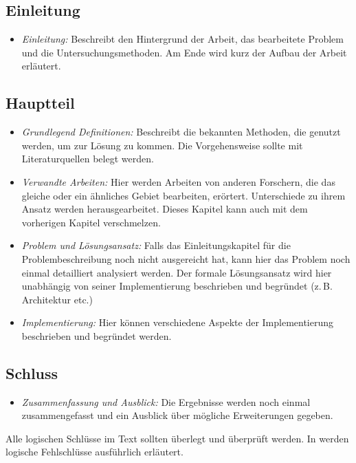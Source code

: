 \documentclass[conference,final,a4paper]{IEEEtran}
\begin{document}
\subsection{Einleitung}
\begin{itemize}
\item \emph{Einleitung:} Beschreibt den Hintergrund der Arbeit, das bearbeitete Problem und die Untersuchungsmethoden. Am Ende wird kurz der Aufbau der Arbeit erläutert.
\end{itemize}
\subsection{Hauptteil}
\begin{itemize}
\item \emph{Grundlegend Definitionen:} Beschreibt die bekannten Methoden, die genutzt werden, um zur Lösung zu kommen. Die Vorgehensweise sollte mit Literaturquellen belegt werden.
\item \emph{Verwandte Arbeiten:} Hier werden Arbeiten von anderen Forschern, die das gleiche oder ein ähnliches Gebiet bearbeiten, erörtert. Unterschiede zu ihrem Ansatz werden herausgearbeitet. Dieses Kapitel kann auch mit dem vorherigen Kapitel verschmelzen.
\item \emph{Problem und Lösungsansatz:} Falls das Einleitungskapitel für die Problembeschreibung noch nicht ausgereicht hat, kann hier das Problem noch einmal detailliert analysiert werden. Der formale Lösungsansatz wird hier unabhängig von seiner Implementierung beschrieben und begründet (z.\,B. Architektur etc.)
\item \emph{Implementierung:} Hier können verschiedene Aspekte der Implementierung beschrieben und begründet werden. 
\end{itemize}
\subsection{Schluss}
\begin{itemize}
\item \emph{Zusammenfassung und Ausblick:} Die Ergebnisse werden noch einmal zusammengefasst und ein Ausblick über mögliche Erweiterungen gegeben.
\end{itemize}


\noindent Alle logischen Schlüsse im Text sollten überlegt und überprüft werden. In \cite{stengel} werden logische Fehlschlüsse ausführlich erläutert.
\end{document}
